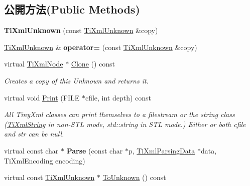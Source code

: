 \subsection*{公開方法(Public Methods)}
\begin{DoxyCompactItemize}
\item 
{\bfseries Ti\+Xml\+Unknown} (const \hyperlink{class_ti_xml_unknown}{Ti\+Xml\+Unknown} \&copy)\hypertarget{class_ti_xml_unknown_abe798ff4feea31474850c7f0de6bdf5e}{}\label{class_ti_xml_unknown_abe798ff4feea31474850c7f0de6bdf5e}

\item 
\hyperlink{class_ti_xml_unknown}{Ti\+Xml\+Unknown} \& {\bfseries operator=} (const \hyperlink{class_ti_xml_unknown}{Ti\+Xml\+Unknown} \&copy)\hypertarget{class_ti_xml_unknown_a60560b5aacb4bdc8b2b5f02f0a99c5c0}{}\label{class_ti_xml_unknown_a60560b5aacb4bdc8b2b5f02f0a99c5c0}

\item 
virtual \hyperlink{class_ti_xml_node}{Ti\+Xml\+Node} $\ast$ \hyperlink{class_ti_xml_unknown_a675c4b2684af35e4c7649b7fd5ae598d}{Clone} () const \hypertarget{class_ti_xml_unknown_a675c4b2684af35e4c7649b7fd5ae598d}{}\label{class_ti_xml_unknown_a675c4b2684af35e4c7649b7fd5ae598d}

\begin{DoxyCompactList}\small\item\em Creates a copy of this Unknown and returns it. \end{DoxyCompactList}\item 
virtual void \hyperlink{class_ti_xml_unknown_a025f19c21ef01ea9be50febb8fe0ba06}{Print} (F\+I\+LE $\ast$cfile, int depth) const 
\begin{DoxyCompactList}\small\item\em All Tiny\+Xml classes can print themselves to a filestream or the string class (\hyperlink{class_ti_xml_string}{Ti\+Xml\+String} in non-\/\+S\+TL mode, std\+::string in S\+TL mode.) Either or both cfile and str can be null. \end{DoxyCompactList}\item 
virtual const char $\ast$ {\bfseries Parse} (const char $\ast$p, \hyperlink{class_ti_xml_parsing_data}{Ti\+Xml\+Parsing\+Data} $\ast$data, Ti\+Xml\+Encoding encoding)\hypertarget{class_ti_xml_unknown_aa51c2694e4177b5f0b5429ee5a81b58d}{}\label{class_ti_xml_unknown_aa51c2694e4177b5f0b5429ee5a81b58d}

\item 
virtual const \hyperlink{class_ti_xml_unknown}{Ti\+Xml\+Unknown} $\ast$ \hyperlink{class_ti_xml_unknown_ab0313e5fe77987d746ac1a97a254419d}{To\+Unknown} () const \hypertarget{class_ti_xml_unknown_ab0313e5fe77987d746ac1a97a254419d}{}\label{class_ti_xml_unknown_ab0313e5fe77987d746ac1a97a254419d}


\end{DoxyCompactItemize}
